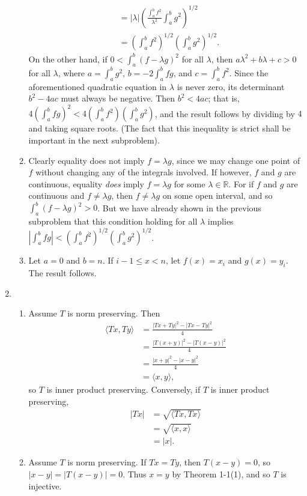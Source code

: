 \documentclass{article}
\begin{document}
\begin{enumerate}[label=\textbf{1-\arabic*.}]
\begin{enumerate}
\begin{align*}
	&= \left|\lambda\right|\left(\frac{\int_a^b f^2}{\lambda^2} \int_a^b g^2\right)^{1/2}\\
	&= \left(\int_a^b f^2\right)^{1/2}\left(\int_a^b g^2\right)^{1/2}.
\end{align*}
On the other hand, if $0 < \int_a^b (f-\lambda g)^2$ for all $\lambda$, then $a\lambda^2 + b\lambda + c > 0$ for all $\lambda$, where $a=\int_a^b g^2$, $b=-2\int_a^b fg$, and $c=\int_a^b f^2$. Since the aforementioned quadratic equation in $\lambda$ is never zero, its determinant $b^2-4ac$ must always be negative. Then $b^2 < 4ac$; that is, $4\left(\int_a^b fg\right)^2 < 4 \left(\int_a^b f^2\right)\left(\int_a^b g^2\right)$, and the result follows by dividing by $4$ and taking square roots. (The fact that this inequality is strict shall be important in the next subproblem).
\item Clearly equality does not imply $f=\lambda g$, since we may change one point of $f$ without changing any of the integrals involved.
If however, $f$ and $g$ are continuous, equality \textit{does} imply $f=\lambda g$ for some $\lambda\in \mathbb R$. For if $f$ and $g$ are continuous and $f\neq \lambda g$, then $f\neq \lambda g$ on some open interval, and so $\int_a^b (f-\lambda g)^2 > 0$. But we have already shown in the previous subproblem that this condition holding for all $\lambda$ implies $\left|\int_a^b fg\right| < \left(\int_a^b f^2\right)^{1/2}\left(\int_a^b g^2\right)^{1/2}$.
\item Let $a=0$ and $b=n$. If $i-1\leq x < n$, let $f(x) = x_i$ and $g(x) = y_i$. The result follows.
\end{enumerate}
\item
\begin{enumerate}
\item Assume $T$ is norm preserving. Then
\begin{align*}
\langle Tx,Ty\rangle &= \frac{|Tx+Ty|^2-|Tx-Ty|^2}{4}\\
	&= \frac{|T(x+y)|^2-|T(x-y)|^2}{4}\\
	&= \frac{|x+y|^2 - |x-y|^2}{4}\\
	&= \langle x, y \rangle,
\end{align*}
so $T$ is inner product preserving. Conversely, if $T$ is inner product preserving,
\begin{align*}
|Tx| &= \sqrt{\langle Tx,Tx\rangle}\\
	&= \sqrt{\langle x,x\rangle}\\
	&= |x|.
\end{align*}
\item Assume $T$ is norm preserving. If $Tx = Ty$, then $T(x-y) = 0$, so $|x-y|=|T(x-y)|=0$. Thus $x=y$ by Theorem 1-1(1), and so $T$ is injective.


\end{enumerate}
\end{enumerate}
\end{document}
